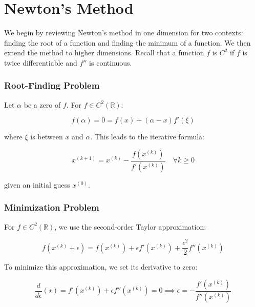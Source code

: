 

\newtheorem{theorem}{Theorem}


\section{Newton's Method}

We begin by reviewing Newton's method in one dimension for two contexts: finding the root of a function and finding the minimum of a function. We then extend the method to higher dimensions. Recall that a function $f$ is $C^2$ if $f$ is twice differentiable and $f''$ is continuous.


\subsubsection*{Root-Finding Problem}

Let $\alpha$ be a zero of $f$. For $f \in C^2(\mathbb{R})$:

\begin{equation}
    f(\alpha) = 0 = f(x) + (\alpha - x)f'(\xi)
\end{equation}

where $\xi$ is between $x$ and $\alpha$. This leads to the iterative formula:

\begin{equation}
    x^{(k+1)} = x^{(k)} - \frac{f(x^{(k)})}{f'(x^{(k)})} \quad \forall k \geq 0
\end{equation}

given an initial guess $x^{(0)}$.

\subsubsection*{Minimization Problem}

For $f \in C^2(\mathbb{R})$, we use the second-order Taylor approximation:

\begin{equation}
    f(x^{(k)} + \epsilon) = f(x^{(k)}) + \epsilon f'(x^{(k)}) + \frac{\epsilon^2}{2}f''(x^{(k)}) \tag{$\star$}
\end{equation}

To minimize this approximation, we set its derivative to zero:

\begin{equation}
    \frac{d}{d\epsilon}(\star) = f'(x^{(k)}) + \epsilon f''(x^{(k)}) = 0 \implies \epsilon = -\frac{f'(x^{(k)})}{f''(x^{(k)})}
\end{equation}

